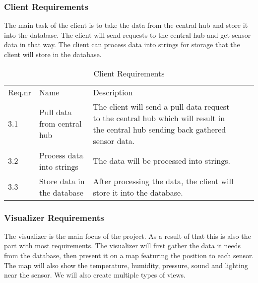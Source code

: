 \documentclass[../document]{subfiles}
\begin{document}
\subsubsection{Client Requirements}
The main task of the client is to take the data from the central hub and store it into the database. The client will send requests to the central hub and get sensor data in that way. The client can process data into strings for storage that the client will store in the database.

\begin{table}[H]
\caption{Client Requirements}
\centering
\begin{tabularx}{\textwidth}{|l|X|X|l|X|}
\hline
\\ \hline Req.nr
&Name
&Description
\\ \hline3.1
&Pull data from central hub
&The client will send a pull data request to the central hub which will result in the central hub sending back gathered sensor data.
\\ \hline3.2
&Process data into strings
&The data will be processed into strings.
\\ \hline3.3
&Store data in the database
&After processing the data, the client will store it into the database.
\\ \hline 
\end{tabularx}
\end{table}

\subsubsection{Visualizer Requirements}
The visualizer is the main focus of the project. As a result of that this is also the part with most requirements. The visualizer will first gather the data it needs from the database, then present it on a map featuring the position to each sensor. The map will also show the temperature, humidity, pressure, sound and lighting near the sensor. We will also create multiple types of views.
\end{document}
